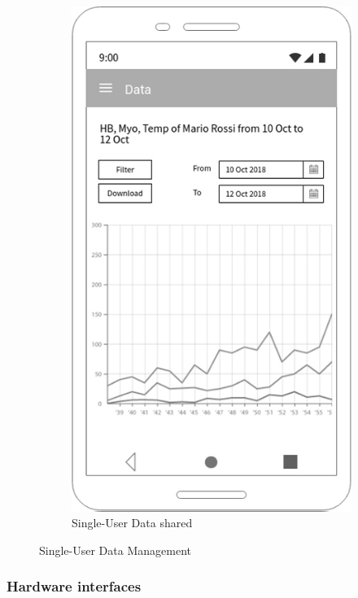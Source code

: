 \begin{figure}[h!]
\begin{subfigure}[b]{0.4\linewidth}
    \includegraphics[width=\linewidth]{img/mockup/tp_data.jpg}
    \caption{Single-User Data shared}
  \end{subfigure}
  \caption{Single-User Data  Management}
 \end{figure}

    \subsubsection{Hardware interfaces}
